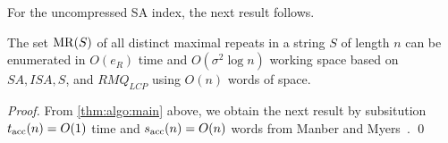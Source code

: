 For the uncompressed SA index, the next result follows. 

\begin{theorem}\label{thm:algo:uncompressed:sa}
  The set $\mathrm{MR}(S)$ of all distinct maximal repeats in a string $S$ of length $n$ can be enumerated in $O(e_R)$ time and $O(\sigma^2 \log n)$ working space based on $SA, ISA, S$, and $RMQ_{LCP}$ using $O(n)$ words of space. 
\end{theorem}

\begin{proof}
  From \cref{thm:algo:main} above, we obtain the next result by subsitution $t_{\mathrm{acc}}(n) = O(1)$ time and $s_{\mathrm{acc}}(n) = O(n)$ words from Manber and Myers~\cite{manber:myers1993suffixarrays}.
  \qed 
\end{proof}




